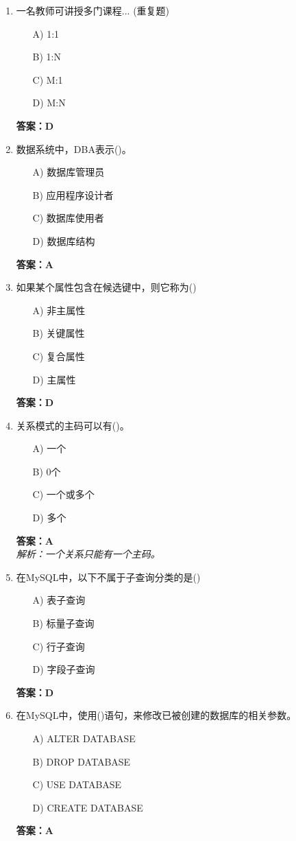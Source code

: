 \documentclass[a4paper,12pt]{article}
\begin{document}
\begin{enumerate}[label=\arabic*.]
\item 一名教师可讲授多门课程... (重复题)
\begin{itemize}
    \item[A)] 1:1
    \item[B)] 1:N
    \item[C)] M:1
    \item[D)] M:N
\end{itemize}
\textbf{答案：D}

\item 数据系统中，DBA表示()。
\begin{itemize}
    \item[A)] 数据库管理员
    \item[B)] 应用程序设计者
    \item[C)] 数据库使用者
    \item[D)] 数据库结构
\end{itemize}
\textbf{答案：A}

\item 如果某个属性包含在候选键中，则它称为()
\begin{itemize}
    \item[A)] 非主属性
    \item[B)] 关键属性
    \item[C)] 复合属性
    \item[D)] 主属性
\end{itemize}
\textbf{答案：D}

\item 关系模式的主码可以有()。
\begin{itemize}
    \item[A)] 一个
    \item[B)] 0个
    \item[C)] 一个或多个
    \item[D)] 多个
\end{itemize}
\textbf{答案：A} \\
\textit{解析：一个关系只能有一个主码。}

\item 在MySQL中，以下不属于子查询分类的是()
\begin{itemize}
    \item[A)] 表子查询
    \item[B)] 标量子查询
    \item[C)] 行子查询
    \item[D)] 字段子查询
\end{itemize}
\textbf{答案：D}

\item 在MySQL中，使用()语句，来修改已被创建的数据库的相关参数。
\begin{itemize}
    \item[A)] ALTER DATABASE
    \item[B)] DROP DATABASE
    \item[C)] USE DATABASE
    \item[D)] CREATE DATABASE
\end{itemize}
\textbf{答案：A}


\end{enumerate}
\end{document}
